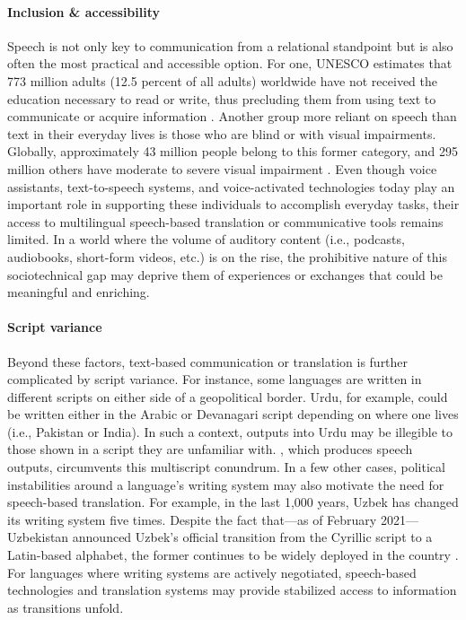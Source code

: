 \paragraph{Inclusion \& accessibility} Speech is not only key to communication from a relational standpoint but is also often the most practical and accessible option. For one, UNESCO estimates that 773 million adults (12.5 percent of all adults) worldwide have not received the education necessary to read or write, thus precluding them from using text to communicate or acquire information \citep{Markelova_2021}. Another group more reliant on speech than text in their everyday lives is those who are blind or with visual impairments. Globally, approximately 43 million people belong to this former category, and 295 million others have moderate to severe visual impairment \citep{bourne2021trends}. Even though voice assistants, text-to-speech systems, and voice-activated technologies today play an important role in supporting these individuals to accomplish everyday tasks, their access to multilingual speech-based translation or communicative tools remains limited. In a world where the volume of auditory content (i.e., podcasts, audiobooks, short-form videos, etc.) is on the rise, the prohibitive nature of this sociotechnical gap may deprive them of experiences or exchanges that could be meaningful and enriching.

\paragraph{Script variance} Beyond these factors, text-based communication or translation is further complicated by script variance. For instance, some languages are written in different scripts on either side of a geopolitical border. %
Urdu, for example, could be written either in the Arabic or Devanagari script depending on where one lives (i.e., Pakistan or India). In such a context, \mt outputs into Urdu may be illegible to those shown in a script they are unfamiliar with. \sst, which produces speech outputs, circumvents this multiscript conundrum. In a few other cases, political instabilities around a language's writing system may also motivate the need for speech-based translation. For example, in the last 1,000 years, Uzbek has changed its writing system five times. Despite the fact that—as of February 2021—Uzbekistan announced Uzbek's official transition from the Cyrillic script to a Latin-based alphabet, the former continues to be widely deployed in the country \citep{jung2023coexistence}. For languages where writing systems are actively negotiated, speech-based technologies and translation systems may provide stabilized access to information as transitions unfold.





